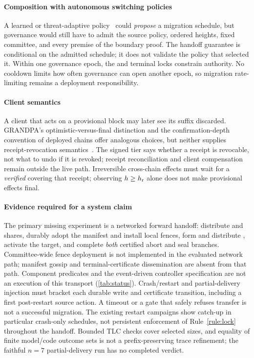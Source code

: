 \paragraph{Composition with autonomous switching policies}
A learned or threat-adaptive policy~\cite{adachain,threatadapt,adacon}
could \emph{propose} a migration schedule, but governance would still have to
admit the source policy, ordered heights, fixed committee, and every premise
of the boundary proof. The handoff guarantee is conditional on the admitted
schedule; it does not validate the policy that selected it. Within one
governance epoch, the \CutCert{} and terminal locks constrain authority.
No cooldown limits how often governance can open another epoch, so migration
rate-limiting remains a deployment responsibility.

\paragraph{Client semantics}
A client that acts on a provisional block may later see its suffix discarded.
GRANDPA's optimistic-versus-final distinction and the confirmation-depth
convention of deployed chains offer analogous choices, but neither supplies
receipt-revocation semantics~\cite{grandpa}. The signed tier says whether a receipt is revocable,
not what to undo if it is revoked; receipt reconciliation and client compensation remain outside
the live path. Irreversible cross-chain effects must wait for a
\emph{verified} \SealCert{} covering that receipt; observing $h\ge h_{\mathrm r}$ alone
does not make provisional effects final.

\paragraph{Evidence required for a system claim}
The primary missing experiment is a networked forward handoff: distribute
\CutCert{} and \ManCert{} shares, durably adopt the manifest and install local
fences, form and distribute \FenceCert, activate the target, and complete
\emph{both} certified abort and seal branches. Committee-wide fence deployment is not
implemented in the evaluated network path; manifest gossip and terminal-certificate dissemination
are absent from that path. Component predicates and the event-driven controller specification
are not an execution of this transport (\cref{tab:status}). Crash/restart and partial-delivery
injection must bracket
each durable write and certificate transition, including a first post-restart
source action. A timeout or a gate that safely refuses transfer is not a
successful migration. The existing restart campaigns show catch-up in particular
crash-only schedules, not persistent enforcement of Rule~\ref{rule:lock}
throughout the handoff. Bounded TLC checks cover selected sizes, and equality
of finite model/code outcome sets is not a prefix-preserving trace refinement;
the faithful $n=7$ partial-delivery run has no completed verdict.

